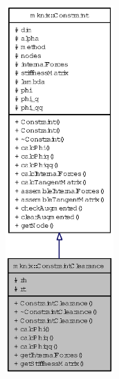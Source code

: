 \begin{figure}[H]
\begin{center}
\leavevmode
\includegraphics[height=400pt]{classmknix_1_1ConstraintClearance__coll__graph}
\end{center}
\end{figure}
